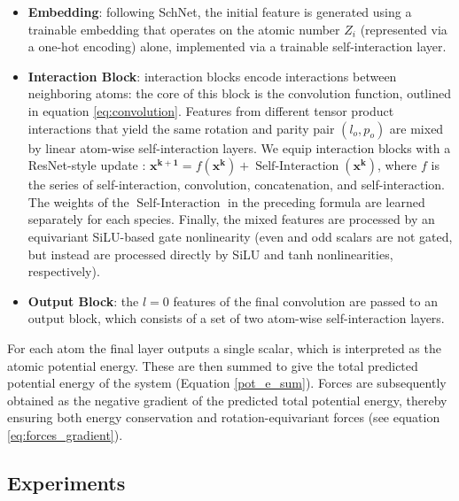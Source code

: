 \documentclass[%
reprint,
superscriptaddress,
nofootinbib,
amsmath,amssymb,
aps,
prl,
]{revtex4-1}
\begin{document}
\begin{itemize}
    \item \textbf{Embedding}: following SchNet, the initial feature is generated using a trainable embedding that operates on the atomic number $Z_i$ (represented via a one-hot encoding) alone, implemented via a trainable self-interaction layer. 
    \item \textbf{Interaction Block}: interaction blocks encode interactions between neighboring atoms: the core of this block is the convolution function, outlined in equation \ref{eq:convolution}. Features from different tensor product interactions that yield the same rotation and parity pair $(l_o, p_o)$ are mixed by linear atom-wise self-interaction layers. We equip interaction blocks with a ResNet-style update \cite{he2016deep}: $\mathbf{x^{k+1}} = f(\mathbf{x^k}) + \operatorname{Self-Interaction}(\mathbf{x^k})$, where $f$ is the series of self-interaction, convolution, concatenation, and self-interaction. The weights of the $\operatorname{Self-Interaction}$ in the preceding formula are learned separately for each species. Finally, the mixed features are processed by an equivariant SiLU-based gate nonlinearity \cite{hendrycks2016gaussian, weiler20183d} (even and odd scalars are not gated, but instead are processed directly by SiLU and tanh nonlinearities, respectively). 
    
    \item \textbf{Output Block}: the $l=0$ features of the final convolution are passed to an output block, which consists of a set of two atom-wise self-interaction layers.
\end{itemize}

For each atom the final layer outputs a single scalar, which is interpreted as the atomic potential energy. These are then summed to give the total predicted potential energy of the system (Equation \ref{pot_e_sum}). Forces are subsequently obtained as the negative gradient of the predicted total potential energy, thereby ensuring both energy conservation and rotation-equivariant forces (see equation \ref{eq:forces_gradient}).  

\subsection{Experiments}
\end{document}
